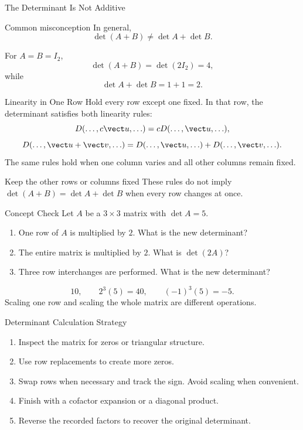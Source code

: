 \begin{frame}{The Determinant Is Not Additive}
\begin{alertblock}{Common misconception}
In general,
\[
\det(A+B)\ne\det A+\det B.
\]
\end{alertblock}
\pause
For $A=B=I_2$,
\[
\det(A+B)=\det(2I_2)=4,
\]
while
\[
\det A+\det B=1+1=2.
\]
\end{frame}

\begin{frame}{Linearity in One Row}
Hold every row except one fixed. In that row, the determinant satisfies both linearity rules:
\[
D(\ldots,c\vect u,\ldots)=cD(\ldots,\vect u,\ldots),
\]
\[
D(\ldots,\vect u+\vect v,\ldots)
=D(\ldots,\vect u,\ldots)+D(\ldots,\vect v,\ldots).
\]
\pause
The same rules hold when one column varies and all other columns remain fixed.
\medskip

\begin{alertblock}{Keep the other rows or columns fixed}
These rules do not imply $\det(A+B)=\det A+\det B$ when every row changes at once.
\end{alertblock}
\end{frame}

\begin{frame}{Concept Check}
Let $A$ be a $3\times3$ matrix with $\det A=5$.
\begin{enumerate}
  \item One row of $A$ is multiplied by $2$. What is the new determinant?
  \item The entire matrix is multiplied by $2$. What is $\det(2A)$?
  \item Three row interchanges are performed. What is the new determinant?
\end{enumerate}
\pause
\[
\boxed{10},
\qquad
\boxed{2^3(5)=40},
\qquad
\boxed{(-1)^3(5)=-5}.
\]
\pause
Scaling one row and scaling the whole matrix are different operations.
\end{frame}

\begin{frame}{Determinant Calculation Strategy}
\begin{enumerate}
  \item Inspect the matrix for zeros or triangular structure.
  \pause
  \item Use row replacements to create more zeros.
  \pause
  \item Swap rows when necessary and track the sign. Avoid scaling when convenient.
  \pause
  \item Finish with a cofactor expansion or a diagonal product.
  \pause
  \item Reverse the recorded factors to recover the original determinant.
\end{enumerate}
\end{frame}
